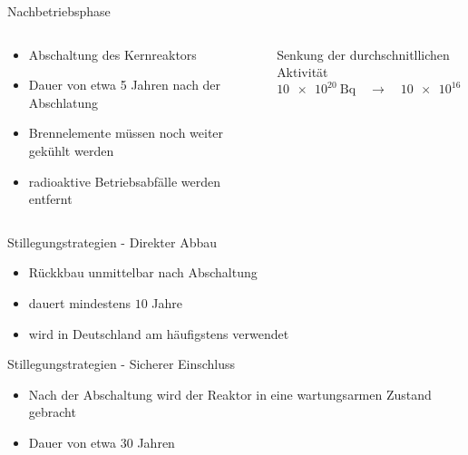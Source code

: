 \begin{frame}{ Nachbetriebsphase }
  \begin{columns}

    \begin{column}{0.48\textwidth}

        \begin{itemize}
          \setlength\itemsep{1.2em}
          \item{ Abschaltung des Kernreaktors }
          \item{ Dauer von etwa 5 Jahren nach der Abschlatung}
          \item{ Brennelemente müssen noch weiter gekühlt werden }
          \item{ radioaktive Betriebsabfälle werden entfernt }
        \end{itemize}

    \end{column}

    \begin{column}{0.48\textwidth}
      Senkung der durchschnitllichen Aktivität
      \begin{equation*}
        \SI{10e20}{\becquerel} \quad \rightarrow  \quad \SI{10e16}{\becquerel}
      \end{equation*}
    \end{column}

  \end{columns}
\end{frame}



\begin{frame}{Stillegungstrategien - Direkter Abbau}
   \begin{itemize}
    \setlength\itemsep{1.2em}
      \item{ Rückkbau unmittelbar nach Abschaltung }
      \item{ dauert mindestens $10$ Jahre }
      \item{ wird in Deutschland am häufigstens verwendet}
  \end{itemize}
\end{frame}



\begin{frame}{Stillegungstrategien - Sicherer Einschluss}
  \begin{itemize}
    \setlength\itemsep{1.2em}
    \item{ Nach der Abschaltung wird der Reaktor in eine wartungsarmen Zustand gebracht}
    \item{ Dauer von etwa $30$ Jahren}
  \end{itemize}
\end{frame}



